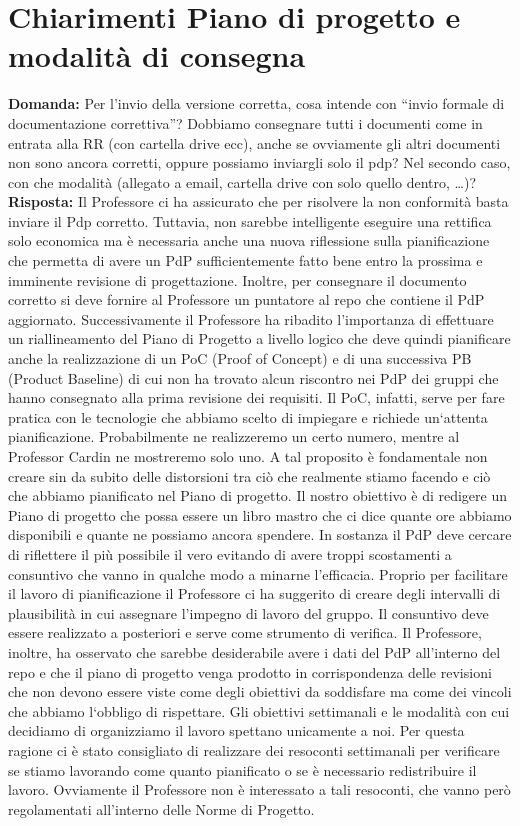 \documentclass{article}
\begin{document}
\section{Chiarimenti Piano di progetto e modalità di consegna}%
\label{sec:piano_di_progetto_e_modalita_di_consegna}
\textbf{Domanda:} Per l’invio della versione corretta, cosa intende con “invio formale di documentazione correttiva”?  Dobbiamo consegnare tutti i documenti come in entrata alla RR (con cartella drive ecc), anche se ovviamente gli altri documenti non sono ancora corretti, oppure possiamo inviargli solo il pdp? Nel secondo caso, con che modalità (allegato a email, cartella drive con solo quello dentro, …)?\\
\textbf{Risposta:} Il Professore ci ha assicurato che per risolvere la non conformità basta inviare il Pdp corretto. Tuttavia, non sarebbe intelligente eseguire una rettifica solo economica ma è necessaria anche una nuova riflessione sulla pianificazione che permetta di avere un PdP sufficientemente fatto bene entro la prossima e imminente revisione di progettazione. Inoltre, per consegnare il documento corretto si deve fornire al Professore un puntatore al repo che contiene il PdP aggiornato. Successivamente il Professore ha ribadito l'importanza di effettuare un riallineamento del Piano di Progetto a livello logico che deve quindi pianificare anche la realizzazione di un PoC (Proof of Concept) e di una successiva PB (Product Baseline) di cui non ha trovato alcun riscontro nei PdP dei gruppi che hanno consegnato alla prima revisione dei requisiti. Il PoC, infatti, serve per fare pratica con le tecnologie che abbiamo scelto di impiegare e richiede un`attenta pianificazione. Probabilmente ne realizzeremo un certo numero, mentre al Professor Cardin ne mostreremo solo uno. A tal proposito è fondamentale non creare sin da subito delle distorsioni tra ciò che realmente stiamo facendo e ciò che abbiamo pianificato nel Piano di progetto. Il nostro obiettivo è di redigere un Piano di progetto che possa essere un libro mastro che ci dice quante ore abbiamo disponibili e quante ne possiamo ancora spendere. In sostanza il PdP deve cercare di riflettere il più possibile il vero evitando di avere troppi scostamenti a consuntivo che vanno in qualche modo a minarne l'efficacia. Proprio per facilitare il lavoro di pianificazione il Professore ci ha suggerito di creare degli intervalli di plausibilità in cui assegnare l'impegno di lavoro del gruppo. Il consuntivo deve essere realizzato a posteriori e serve come strumento di verifica. Il Professore, inoltre, ha osservato che sarebbe desiderabile avere i dati del PdP all'interno del repo e che il piano di progetto venga prodotto in corrispondenza delle revisioni che non devono essere viste come degli obiettivi da soddisfare ma come dei vincoli che abbiamo l`obbligo di rispettare. Gli obiettivi settimanali e le modalità con cui decidiamo di organizziamo il lavoro spettano unicamente a noi. Per questa ragione ci è stato consigliato di realizzare dei resoconti settimanali per verificare se stiamo lavorando come quanto pianificato o se è necessario redistribuire il lavoro. Ovviamente il Professore non è interessato a tali resoconti, che vanno però regolamentati all'interno delle Norme di Progetto.
\end{document}
